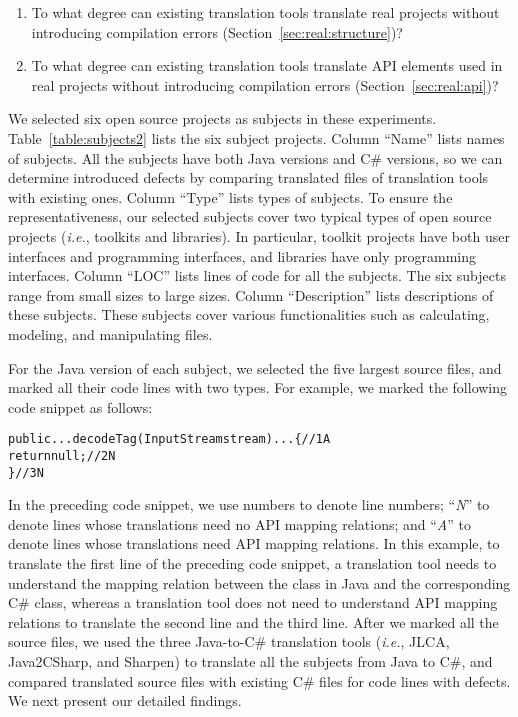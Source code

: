 \begin{enumerate}
\item To what degree can existing translation tools translate real projects without introducing compilation errors (Section~\ref{sec:real:structure})?
\item To what degree can existing translation tools translate API elements used in real projects without introducing compilation errors (Section~\ref{sec:real:api})?
\end{enumerate}%



We selected six open source projects as subjects in these experiments. Table~\ref{table:subjects2} lists the six subject projects. Column ``Name'' lists names of subjects. All the subjects have both Java versions and C\# versions, so we can determine introduced defects by comparing translated files of translation tools with existing ones. Column ``Type'' lists types of subjects. To ensure the representativeness, our selected subjects cover two typical types of open source projects (\emph{i.e.}, toolkits and libraries). In particular, toolkit projects have both user interfaces and programming interfaces, and libraries have only programming interfaces. Column ``LOC'' lists lines of code for all the subjects. The six subjects range from small sizes to large sizes. Column ``Description'' lists descriptions of these subjects. These subjects cover various functionalities such as calculating, modeling, and manipulating files.

For the Java version of each subject, we selected the five largest source files, and marked all their code lines with two types. For example, we marked the following code snippet as follows:

\begin{CodeOut}%
\begin{alltt}
public ... decodeTag(InputStream stream) ... \{//1A
  return null;//2N
\}//3N
\end{alltt}
\end{CodeOut}

In the preceding code snippet, we use numbers to denote line numbers; ``\emph{N}'' to denote lines whose translations need no API mapping relations; and ``\emph{A}'' to denote lines whose translations need API mapping relations. In this example, to translate the first line of the preceding code snippet, a translation tool needs to understand the mapping relation between the  class in Java and the corresponding C\# class, whereas a translation tool does not need to understand API mapping relations to translate the second line and the third line. After we marked all the source files, we used the three Java-to-C\# translation tools (\emph{i.e.}, JLCA, Java2CSharp, and Sharpen) to translate all the subjects from Java to C\#, and compared translated source files with existing C\# files for code lines with defects. We next present our detailed findings.

